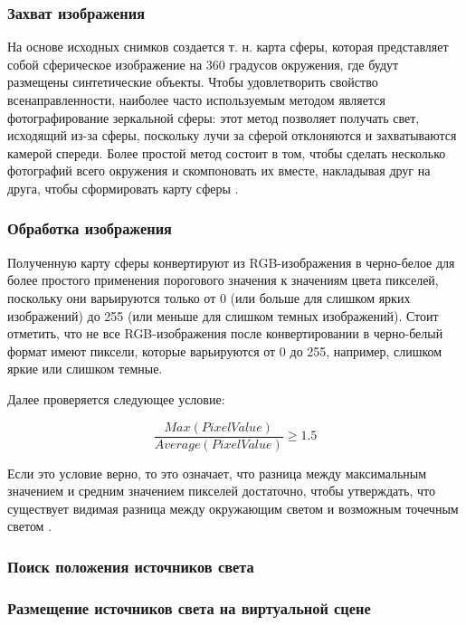 \subsubsection*{Захват изображения}

На основе исходных снимков создается т. н. карта сферы, которая представляет собой сферическое изображение на 360 градусов окружения, где будут размещены синтетические объекты. Чтобы удовлетворить свойство всенаправленности, наиболее часто используемым методом является фотографирование зеркальной сферы: этот метод позволяет получать свет, исходящий из-за сферы, поскольку лучи за сферой отклоняются и захватываются камерой спереди. Более простой метод состоит в том, чтобы сделать несколько фотографий всего окружения и скомпоновать их вместе, накладывая друг на друга, чтобы сформировать карту сферы \cite{rtsm}.

\subsubsection*{Обработка изображения}

Полученную карту сферы конвертируют из RGB-изображения в черно-белое для более простого применения порогового значения к
значениям цвета пикселей, поскольку они варьируются только от 0 (или больше для слишком ярких изображений) до 255 (или меньше для слишком темных изображений). Стоит отметить, что не все RGB-изображения после конвертировании в черно-белый формат имеют пиксели, которые варьируются от 0 до 255, например, слишком яркие или слишком темные.

Далее проверяется следующее условие:

\begin{equation}
	\frac{Max(PixelValue)}{Average(PixelValue)} \geq 1.5
\end{equation}

Если это условие верно, то это означает, что разница между максимальным значением и средним значением пикселей достаточно, чтобы утверждать, что существует видимая разница между окружающим светом и возможным точечным светом \cite{rtsm}.

\subsubsection*{Поиск положения источников света}



\subsubsection*{Размещение источников света на виртуальной сцене}



